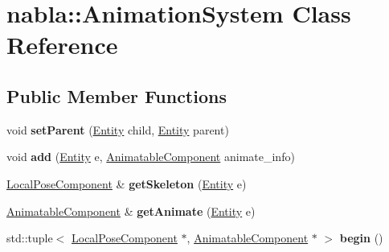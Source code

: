 \hypertarget{classnabla_1_1_animation_system}{}\section{nabla\+::Animation\+System Class Reference}
\label{classnabla_1_1_animation_system}
\subsection*{Public Member Functions}
\begin{DoxyCompactItemize}
\item 
\mbox{\label{classnabla_1_1_animation_system_a11a13061b373dde465d20615b35535a0}} 
void {\bfseries set\+Parent} (\mbox{\hyperlink{structnabla_1_1_entity}{Entity}} child, \mbox{\hyperlink{structnabla_1_1_entity}{Entity}} parent)
\item 
\mbox{\label{classnabla_1_1_animation_system_abdd187b0c5bae290de66e90b5b04ae71}} 
void {\bfseries add} (\mbox{\hyperlink{structnabla_1_1_entity}{Entity}} e, \mbox{\hyperlink{structnabla_1_1_animatable_component}{Animatable\+Component}} animate\+\_\+info)
\item 
\mbox{\label{classnabla_1_1_animation_system_a040b464a66763e67f1f557d9a14236b3}} 
\mbox{\hyperlink{structnabla_1_1_local_pose_component}{Local\+Pose\+Component}} \& {\bfseries get\+Skeleton} (\mbox{\hyperlink{structnabla_1_1_entity}{Entity}} e)
\item 
\mbox{\label{classnabla_1_1_animation_system_a2127a38740a50f1556417b0350c28c90}} 
\mbox{\hyperlink{structnabla_1_1_animatable_component}{Animatable\+Component}} \& {\bfseries get\+Animate} (\mbox{\hyperlink{structnabla_1_1_entity}{Entity}} e)
\item 
\mbox{\label{classnabla_1_1_animation_system_adf41e641caa9f5c0f63b493693c97937}} 
std\+::tuple$<$ \mbox{\hyperlink{structnabla_1_1_local_pose_component}{Local\+Pose\+Component}} $\ast$, \mbox{\hyperlink{structnabla_1_1_animatable_component}{Animatable\+Component}} $\ast$ $>$ {\bfseries begin} ()
\item 
\mbox{\label{classnabla_1_1_animation_system_aa8766d6a9b932c9ee32a396d2a633300}} 

\end{DoxyCompactItemize}
